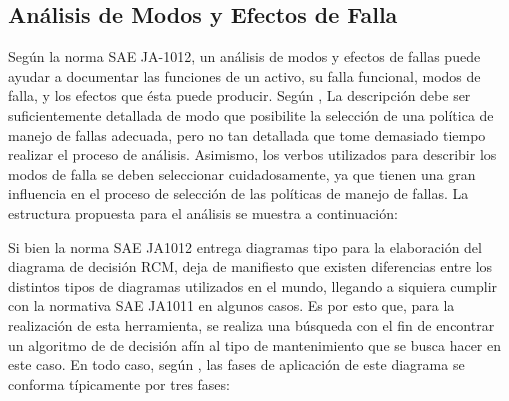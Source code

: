 \subsection{Análisis de Modos y Efectos de Falla}
Según la norma SAE JA-1012, un análisis de modos y efectos de fallas puede ayudar a documentar las funciones de un activo, su falla funcional, modos de falla, y los efectos que ésta puede producir. Según \cite{saeja1012}, La descripción debe ser suficientemente detallada de modo que posibilite la selección de una política de manejo de fallas adecuada, pero no tan detallada que tome demasiado tiempo realizar el proceso de análisis. Asimismo, los verbos utilizados para describir los modos de falla se deben seleccionar cuidadosamente, ya que tienen una gran influencia en el proceso de selección de las políticas de manejo de fallas. La estructura propuesta para el análisis se muestra a continuación:


\begin{table}[H]
  \centering
 
    
    \caption{Estructura propuesta para hoja de Información RCM.}
  \label{tab:addlabel}%
\end{table}%

Si bien la norma SAE JA1012 entrega diagramas tipo para la elaboración del diagrama de decisión RCM, deja de manifiesto que existen diferencias entre los distintos tipos de diagramas utilizados en el mundo, llegando a siquiera cumplir con la normativa SAE JA1011 en algunos casos. Es por esto que, para la realización de esta herramienta, se realiza una búsqueda con el fin de encontrar un algoritmo de de decisión afín al tipo de mantenimiento que se busca hacer en este caso. En todo caso, según \cite{saeja1012}, las fases de aplicación de este diagrama se conforma típicamente por tres fases:

